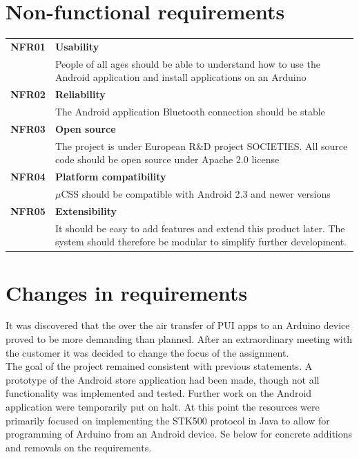 \section{Non-functional requirements}
\label{non-functional}
	\begin{table}[H]
	\begin{tabularx}{\linewidth}{lX}
		\textbf{NFR01} & \textbf{Usability}\\
		 & People of all ages should be able to understand how to use the Android application and install applications on an Arduino\\
		\textbf{NFR02} & \textbf{Reliability}\\
		 & The Android application  Bluetooth connection should be stable\\
		\textbf{NFR03} & \textbf{Open source}\\
		 & The project is under European R\&D project SOCIETIES. All source code should be open source under Apache 2.0 license\\
		\textbf{NFR04} & \textbf{Platform compatibility}\\
		 & $\mu$CSS should be compatible with Android 2.3 and newer versions\\
		\textbf{NFR05} & \textbf{Extensibility}\\
		 & It should be easy to add features and extend this product later. The system should therefore be modular to simplify further development.\\
	\end{tabularx}
	\end{table}

\section{Changes in requirements}
It was discovered that the over the air transfer of PUI apps to an Arduino device proved to be more demanding than planned. After an extraordinary meeting with the customer it was decided to change the focus of the assignment. \\
\newline
The goal of the project remained consistent with previous statements. A prototype of the Android store application had been made, though not all functionality was implemented and tested. Further work on the Android application were temporarily put on halt. At this point the resources were primarily focused on implementing the STK500 protocol in Java to allow for programming of Arduino from an Android device. Se below for concrete additions and removals on the requirements.

